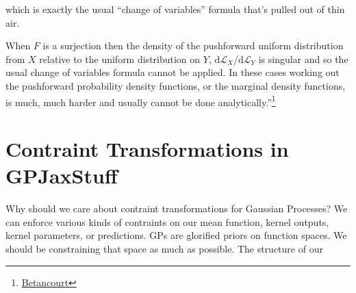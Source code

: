 \documentclass[
  letterpaper,
  DIV=11,
  numbers=noendperiod]{scrartcl}
\begin{document}
which is exactly the usual ``change of variables'' formula that's pulled
out of thin air.

When \(F\) is a surjection then the density of the pushforward uniform
distribution from \(X\) relative to the uniform distribution on \(Y\),
\(\mathrm{d}\mathcal{L}_{X}\)/\(\mathrm{d}\mathcal{L}_{Y}\) is singular
and so the usual change of variables formula cannot be applied. In these
cases working out the pushforward probability density functions, or the
marginal density functions, is much, much harder and usually cannot be
done analytically.''\footnote{\href{https://discourse.mc-stan.org/t/why-transformations-need-to-be-invertible-in-change-of-variable-in-probability-theory/22317/11?u=mike1}{Betancourt}}

\section{Contraint Transformations in
GPJaxStuff}\label{contraint-transformations-in-gpjaxstuff}

Why should we care about contraint transformations for Gaussian
Processes? We can enforce various kinds of contraints on our mean
function, kernel outputs, kernel parameters, or predictions. GPs are
glorified priors on function spaces. We should be constraining that
space as much as possible. The structure of our
\end{document}
